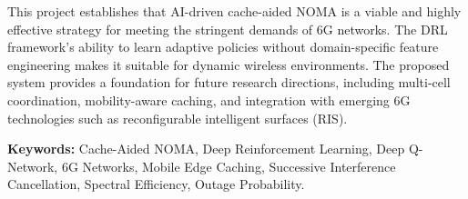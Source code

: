 \documentclass[12pt,a4paper]{article}
\begin{document}
\begin{singlespace}
This project establishes that AI-driven cache-aided NOMA is a viable and highly effective strategy for meeting the stringent demands of 6G networks. The DRL framework's ability to learn adaptive policies without domain-specific feature engineering makes it suitable for dynamic wireless environments. The proposed system provides a foundation for future research directions, including multi-cell coordination, mobility-aware caching, and integration with emerging 6G technologies such as reconfigurable intelligent surfaces (RIS).

\vspace{0.5cm}

\noindent
\textbf{Keywords:} Cache-Aided NOMA, Deep Reinforcement Learning, Deep Q-Network, 6G Networks, Mobile Edge Caching, Successive Interference Cancellation, Spectral Efficiency, Outage Probability.
\end{singlespace}

\thispagestyle{plain}


\clearpage

\renewcommand{\cfttoctitlefont}{\normalfont\bfseries\fontsize{14}{17}\selectfont}
\renewcommand{\cftaftertoctitle}{\hfill}
\renewcommand{\contentsname}{TABLE OF CONTENTS} %

\setlength{\cftsecnumwidth}{2.5em}
\setlength{\cftsecindent}{0pt}
\setlength{\cftbeforesecskip}{6pt}
\setlength{\cftsubsecnumwidth}{3.5em}
\setlength{\cftsubsecindent}{2.5em}

\renewcommand{\cftsecleader}{\cftdotfill{\cftdotsep}}

\tableofcontents
\thispagestyle{plain}

\end{document}
